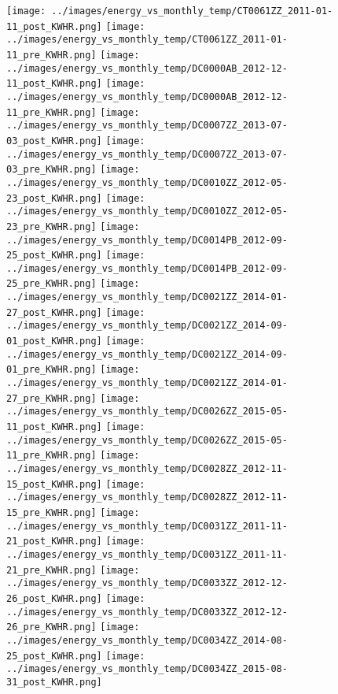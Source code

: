 \clearpage
\begin{figure}
\centering
\texttt{[image: ../images/energy\_vs\_monthly\_temp/CT0061ZZ\_2011-01-11\_post\_KWHR.png]}
\texttt{[image: ../images/energy\_vs\_monthly\_temp/CT0061ZZ\_2011-01-11\_pre\_KWHR.png]}
\texttt{[image: ../images/energy\_vs\_monthly\_temp/DC0000AB\_2012-12-11\_post\_KWHR.png]}
\texttt{[image: ../images/energy\_vs\_monthly\_temp/DC0000AB\_2012-12-11\_pre\_KWHR.png]}
\texttt{[image: ../images/energy\_vs\_monthly\_temp/DC0007ZZ\_2013-07-03\_post\_KWHR.png]}
\texttt{[image: ../images/energy\_vs\_monthly\_temp/DC0007ZZ\_2013-07-03\_pre\_KWHR.png]}
\texttt{[image: ../images/energy\_vs\_monthly\_temp/DC0010ZZ\_2012-05-23\_post\_KWHR.png]}
\texttt{[image: ../images/energy\_vs\_monthly\_temp/DC0010ZZ\_2012-05-23\_pre\_KWHR.png]}
\texttt{[image: ../images/energy\_vs\_monthly\_temp/DC0014PB\_2012-09-25\_post\_KWHR.png]}
\texttt{[image: ../images/energy\_vs\_monthly\_temp/DC0014PB\_2012-09-25\_pre\_KWHR.png]}
\texttt{[image: ../images/energy\_vs\_monthly\_temp/DC0021ZZ\_2014-01-27\_post\_KWHR.png]}
\texttt{[image: ../images/energy\_vs\_monthly\_temp/DC0021ZZ\_2014-09-01\_post\_KWHR.png]}
\texttt{[image: ../images/energy\_vs\_monthly\_temp/DC0021ZZ\_2014-09-01\_pre\_KWHR.png]}
\texttt{[image: ../images/energy\_vs\_monthly\_temp/DC0021ZZ\_2014-01-27\_pre\_KWHR.png]}
\texttt{[image: ../images/energy\_vs\_monthly\_temp/DC0026ZZ\_2015-05-11\_post\_KWHR.png]}
\texttt{[image: ../images/energy\_vs\_monthly\_temp/DC0026ZZ\_2015-05-11\_pre\_KWHR.png]}
\texttt{[image: ../images/energy\_vs\_monthly\_temp/DC0028ZZ\_2012-11-15\_post\_KWHR.png]}
\texttt{[image: ../images/energy\_vs\_monthly\_temp/DC0028ZZ\_2012-11-15\_pre\_KWHR.png]}
\texttt{[image: ../images/energy\_vs\_monthly\_temp/DC0031ZZ\_2011-11-21\_post\_KWHR.png]}
\texttt{[image: ../images/energy\_vs\_monthly\_temp/DC0031ZZ\_2011-11-21\_pre\_KWHR.png]}
\texttt{[image: ../images/energy\_vs\_monthly\_temp/DC0033ZZ\_2012-12-26\_post\_KWHR.png]}
\texttt{[image: ../images/energy\_vs\_monthly\_temp/DC0033ZZ\_2012-12-26\_pre\_KWHR.png]}
\texttt{[image: ../images/energy\_vs\_monthly\_temp/DC0034ZZ\_2014-08-25\_post\_KWHR.png]}
\texttt{[image: ../images/energy\_vs\_monthly\_temp/DC0034ZZ\_2015-08-31\_post\_KWHR.png]}
\end{figure}
